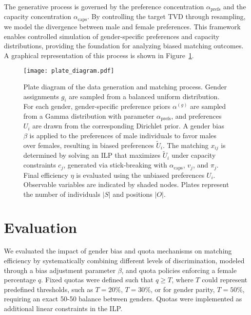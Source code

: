 \documentclass[letterpaper]{article}
\begin{document}
The generative process is governed by the preference concentration \( \alpha_\mathrm{prefs} \) and the capacity concentration \( \alpha_\mathrm{caps} \). By controlling the target TVD through resampling, we model the divergence between male and female preferences. This framework enables controlled simulation of gender-specific preferences and capacity distributions, providing the foundation for analyzing biased matching outcomes. A graphical representation of this process is shown in Figure~\ref{fig:plate_diagram}.



\begin{figure}[ht]

  \centering
  \texttt{[image: plate\_diagram.pdf]}
\caption{Plate diagram of the data generation and matching process. Gender assignments \( g_i \) are sampled from a balanced uniform distribution. For each gender, gender-specific preference priors \( \alpha^{(g)} \) are sampled from a Gamma distribution with parameter \( \alpha_\mathrm{prefs} \), and preferences \( U_i \) are drawn from the corresponding Dirichlet prior. A gender bias \( \beta \) is applied to the preferences of male individuals to favor males over females, resulting in biased preferences \( \tilde{U}_i \). The matching \( x_{ij} \) is determined by solving an ILP that maximizes \( \tilde{U}_i \) under capacity constraints \( c_j \), generated via stick-breaking with \( \alpha_\mathrm{caps} \), \( v_j \), and \( \pi_j \). Final efficiency \( \eta \) is evaluated using the unbiased preferences \( U_i \). Observable variables are indicated by shaded nodes. Plates represent the number of individuals \( |S| \) and positions \( |O| \).}

  \label{fig:plate_diagram}
\end{figure}

\section{Evaluation}

We evaluated the impact of gender bias and quota mechanisms on matching efficiency by systematically combining different levels of discrimination, modeled through a bias adjustment parameter \( \beta \), and quota policies enforcing a female percentage \(q\). Fixed quotas were defined such that \( q \geq T \), where \( T \) could represent predefined thresholds, such as \( T = 20\%\), \( T = 30\%\), or for gender parity, \( T = 50\%\), requiring an exact 50-50 balance between genders. Quotas were implemented as additional linear constraints in the ILP. 
\end{document}
